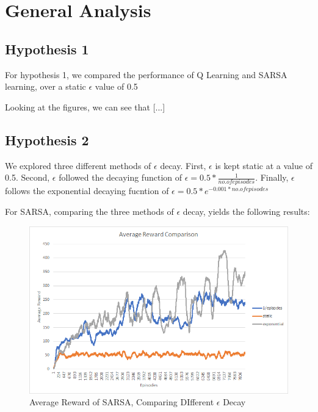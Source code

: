 \section{General Analysis}


\subsection{Hypothesis 1}

For hypothesis 1, we compared the performance of Q Learning and SARSA learning, over a static $\epsilon$ value of 0.5

Looking at the figures, we can see that [...]

\subsection{Hypothesis 2}

We explored three different methods of $\epsilon$ decay. First, $\epsilon$ is kept static at a value of 0.5. Second, 
$\epsilon$ followed the decaying function of $\epsilon = 0.5 * \frac{1}{no. of episodes}$. Finally,
$\epsilon$ follows the exponential decaying fucntion of $\epsilon = 0.5 * e^{-0.001*no. of episodes}$

For SARSA, comparing the three methods of $\epsilon$ decay, yields the following results:

\begin{figure}[H] %
    \centering
    \includegraphics[width=0.75\linewidth]{epsilon-decay-comparison.png}
    \caption{Average Reward of SARSA, Comparing DIfferent $\epsilon$ Decay}
\end{figure}

